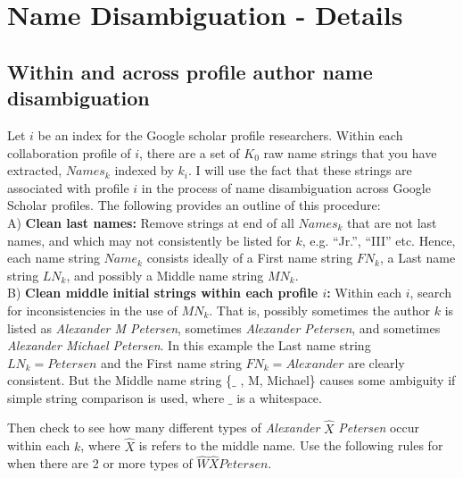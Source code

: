 \section{Name Disambiguation - Details}
\subsection{Within and across profile author name disambiguation}

Let $i$ be an index for the Google scholar profile researchers. Within each collaboration profile of $i$,  there are a set of $K_{0}$ raw name strings that you have extracted,  $Names_{k}$ indexed by $k_{i}$. I will use the fact that these strings are associated with profile $i$ in the process of name disambiguation across Google Scholar profiles. The following provides an outline of this procedure: \\


A) {\bf Clean last names:} 
Remove strings at end of all $Names_{k}$ that are not last names, and which may not consistently be listed for $k$, e.g. ``Jr.'', ``III'' etc. Hence, each name string  $Name_{k}$ consists ideally of a First name string $FN_{k}$, a Last name string $LN_{k}$, and possibly a Middle name string $MN_{k}$. \\

B)  {\bf Clean middle initial strings within each profile $i$:}  Within each $i$, search for inconsistencies in the use of $MN_{k}$. That is, possibly sometimes the author $k$ is listed as {\it Alexander M Petersen}, sometimes {\it Alexander Petersen}, and sometimes {\it Alexander Michael Petersen}. In this example the Last name string $LN_{k} = Petersen$ and the First name string $FN_{k} = Alexander$ are clearly consistent. But the Middle name string \{$\_$ , M, Michael\} causes some ambiguity if simple string comparison is used,  where $\_$ is a whitespace. 


Then check to see how many different types of {\it Alexander} $\hat X$ {\it Petersen} occur within each $k$, where $\hat X$ is refers to the middle name. Use the following rules for when there are 2 or more types of $\hat W \hat X Petersen$.
 
